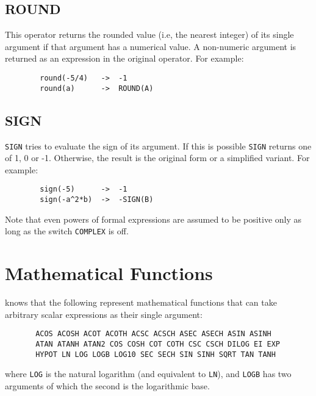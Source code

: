 \subsection{ROUND}
This operator returns the rounded value (i.e, the nearest integer) of its
single argument if that argument has a numerical value.  A non-numeric
argument is returned as an expression in the original operator.  For
example:
\begin{verbatim}
        round(-5/4)   ->  -1
        round(a)      ->  ROUND(A)
\end{verbatim}

\subsection{SIGN}
{\tt SIGN} tries to evaluate the sign of its argument. If this
is possible {\tt SIGN} returns one of 1, 0 or -1.  Otherwise, the result
is the original form or a simplified variant. For example:
\begin{verbatim}
        sign(-5)      ->  -1
        sign(-a^2*b)  ->  -SIGN(B)
\end{verbatim}
Note that even powers of formal expressions are assumed to be
positive only as long as the switch {\tt COMPLEX} is off.

\section{Mathematical Functions}

{\REDUCE} knows that the following represent mathematical functions
 that can
take arbitrary scalar expressions as their single argument:
\begin{verbatim}
       ACOS ACOSH ACOT ACOTH ACSC ACSCH ASEC ASECH ASIN ASINH
       ATAN ATANH ATAN2 COS COSH COT COTH CSC CSCH DILOG EI EXP
       HYPOT LN LOG LOGB LOG10 SEC SECH SIN SINH SQRT TAN TANH
\end{verbatim}
where {\tt LOG} is the natural logarithm (and equivalent to {\tt LN}),
and {\tt LOGB} has two arguments of which the second is the logarithmic base.

